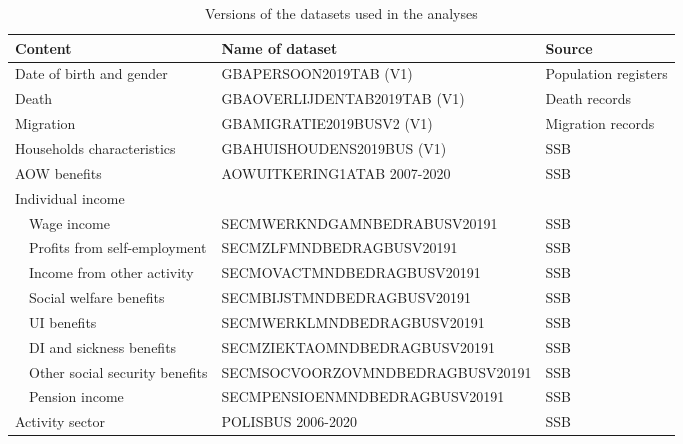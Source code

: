 \documentclass[12pt,a4paper]{article}
\begin{document}
\begin{table}[ht!]
	\caption{Versions of the datasets used in the analyses}
	\label{data_version}
	\begin{center} 						
		\begin{adjustbox}{max width = \textwidth, max totalheight=.9\textheight, keepaspectratio}						
			\begin{tabular}{lll}	
				\toprule
				\textbf{Content}	&	\textbf{Name of dataset}	&	\textbf{Source}	\\
				\hline					
				Date of birth and gender	&	GBAPERSOON2019TAB (V1)	&	Population registers	\\
				Death	&	GBAOVERLIJDENTAB2019TAB (V1) 	&	Death records	\\
				Migration	&	GBAMIGRATIE2019BUSV2 (V1) 	&	Migration records	\\
				Households characteristics 	&	GBAHUISHOUDENS2019BUS (V1)	&	SSB	\\
				AOW benefits	&	AOWUITKERING1ATAB 2007-2020	&	SSB	\\
		

				Individual income	&		&		\\
				\ \ Wage income 	&	SECMWERKNDGAMNBEDRABUSV20191	&	SSB	\\
				\ \ Profits from self-employment 	&	SECMZLFMNDBEDRAGBUSV20191	&	SSB	\\
				\ \ Income from other activity 	&	SECMOVACTMNDBEDRAGBUSV20191	&	SSB	\\
				\ \ Social welfare benefits 	&	SECMBIJSTMNDBEDRAGBUSV20191	&	SSB	\\
				\ \ UI benefits 	&	SECMWERKLMNDBEDRAGBUSV20191	&	SSB	\\
				\ \ DI and sickness benefits 	&	SECMZIEKTAOMNDBEDRAGBUSV20191	&	SSB	\\
				\ \ Other social security benefits 	&	SECMSOCVOORZOVMNDBEDRAGBUSV20191	&	SSB	\\
				\ \ Pension income 	&	SECMPENSIOENMNDBEDRAGBUSV20191	&	SSB	\\
				Activity sector 	&	POLISBUS 2006-2020	&	SSB	\\				
				\bottomrule					
			\end{tabular}						
		\end{adjustbox}						
	\end{center}						
\end{table}						
\end{document}
